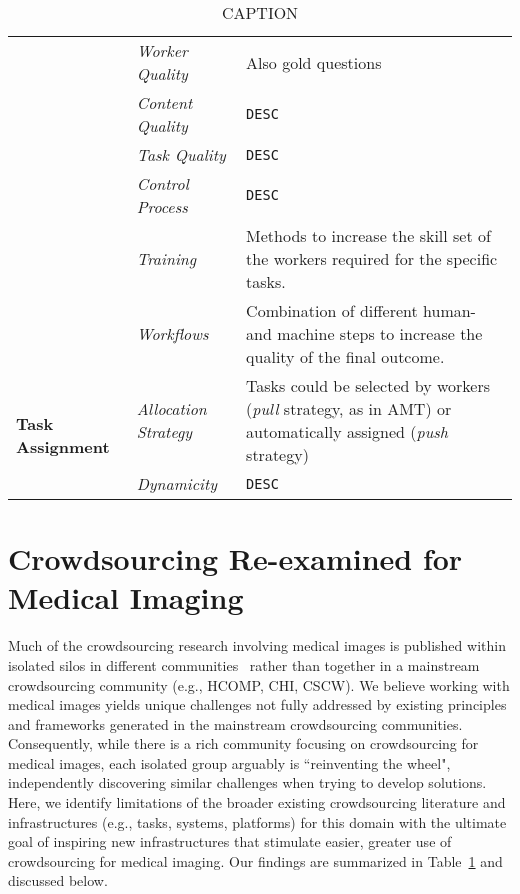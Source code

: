 \documentclass[10pt,twocolumn,letterpaper]{article}
\begin{document}
\begin{table*}
\begin{tabular}{lm{75px}m{320px}}
									 	& \textit{Worker Quality} & Also gold questions \\	\cline{2-3}
									 	& \textit{Content Quality} & \texttt{DESC} \\	\cline{2-3}		
									 	& \textit{Task Quality} & \texttt{DESC} \\	\cline{2-3}
									 	& \textit{Control Process} & \texttt{DESC} \\ \cline{2-3}	
									 	& \textit{Training} & Methods to increase the skill set of the workers required for the specific tasks. \\\cline{2-3}	
									 	& \textit{Workflows} & Combination of different human- and machine steps to increase the quality of the final outcome. \\					
									 	
									 	\midrule	
		\multirow{2}{*}{\textbf{Task Assignment}}	& \textit{Allocation Strategy} & Tasks could be selected by workers (\emph{pull} strategy, as in AMT) or automatically assigned (\emph{push} strategy)  \\ \cline{2-3}
									 	& \textit{Dynamicity} & \texttt{DESC} \\	
													

    \bottomrule
    \end{tabular}
    \caption{CAPTION}
    \label{tab:stats}
\end{table*}




\section{Crowdsourcing Re-examined for Medical Imaging}
Much of the crowdsourcing research involving medical images is published within isolated silos in different communities~\cite{} rather than together in a mainstream crowdsourcing community (e.g., HCOMP, CHI, CSCW).  We believe working with medical images yields unique challenges not fully addressed by existing principles and frameworks generated in the mainstream crowdsourcing communities.  Consequently, while there is a rich community focusing on crowdsourcing for medical images, each isolated group arguably is ``reinventing the wheel", independently discovering similar challenges when trying to develop solutions.  Here, we identify limitations of the broader existing crowdsourcing literature and infrastructures (e.g., tasks, systems, platforms) for this domain with the ultimate goal of inspiring new infrastructures that stimulate easier, greater use of crowdsourcing for medical imaging.  Our findings are summarized in Table~\ref{} and discussed below.
\end{document}
